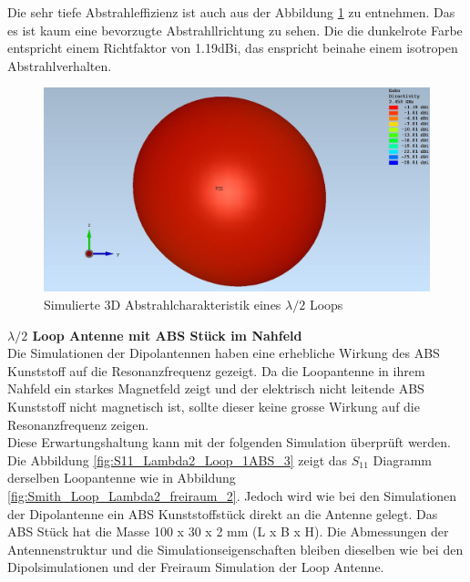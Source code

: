 Die sehr tiefe Abstrahleffizienz ist auch aus der Abbildung \ref{fig:sim_Loop_freiraum_3D} zu entnehmen. Das es ist kaum eine bevorzugte Abstrahllrichtung zu sehen. Die die dunkelrote Farbe entspricht einem Richtfaktor von 1.19dBi, das enspricht beinahe einem isotropen Abstrahlverhalten.
\begin{figure}[h]
	\centering
	\includegraphics[width=13cm]{content/bilder/Evaluation/Loop/L2/ohneABS/EM_Far_Field_Loop_Lambda2_ohneABS.JPG}%
	\caption{Simulierte 3D Abstrahlcharakteristik eines $\lambda/2$ Loops}
	\label{fig:sim_Loop_freiraum_3D}
\end{figure}
\newpage
\textbf{$\lambda/2$ Loop Antenne mit ABS Stück im Nahfeld}\\
Die Simulationen der Dipolantennen haben eine erhebliche Wirkung des ABS Kunststoff auf die Resonanzfrequenz gezeigt. Da die Loopantenne in ihrem Nahfeld ein starkes Magnetfeld zeigt und der elektrisch nicht leitende ABS Kunststoff  nicht magnetisch ist, sollte dieser keine grosse Wirkung auf die Resonanzfrequenz zeigen.\\ Diese Erwartungshaltung kann mit der folgenden Simulation überprüft werden.\\
 
Die Abbildung \ref{fig:S11_Lambda2_Loop_1ABS_3} zeigt das $S_{11}$ Diagramm derselben Loopantenne wie in Abbildung \ref{fig:Smith_Loop_Lambda2_freiraum_2}. Jedoch wird wie bei den Simulationen der Dipolantenne ein ABS Kunststoffstück direkt an die Antenne gelegt. Das ABS Stück hat die Masse 100 x 30 x 2 mm (L x B x H). Die Abmessungen der Antennenstruktur und die Simulationseigenschaften bleiben  dieselben wie bei den Dipolsimulationen und der Freiraum Simulation der Loop Antenne.\\

